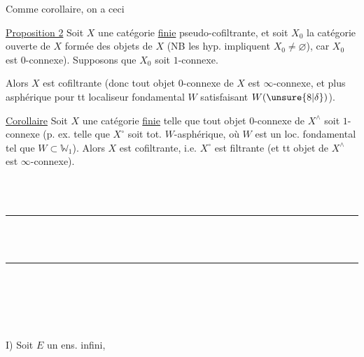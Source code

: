 Comme corollaire, on a ceci

\uline{Proposition 2} Soit $X$ une catégorie \uline{finie} pseudo-cofiltrante,  et soit $X_0$ la catégorie ouverte de $X$ formée des  objets de $X$ (NB les hyp. impliquent $X_0\ne\varnothing$), car $X_0$ est $0$-connexe). Supposons que $X_0$ soit $1$-connexe.

Alors $X$ est cofiltrante (donc tout objet $0$-connexe de $X$ est $\infty$-connexe, et plus  asphérique pour tt  localiseur fondamental $W$ satisfaisant $W(\unsure{8|\delta})$).

 \uline{Corollaire} Soit $X$ une catégorie \uline{finie} telle que tout objet $0$-connexe de $X^\wedge$ soit $1$-connexe (p. ex. telle que $X^\circ$ soit tot. $W$-asphérique, où $W$ est un loc. fondamental tel que $W\subset\mathbb{W}_1$). Alors $X$ est cofiltrante, i.e. $X^\circ$ est filtrante (et tt objet de $X^\wedge$ est $\infty$-connexe).

\\
\\
\rule{1cm}{0.3pt}

\\
\\
\rule{1cm}{0.3pt}

\\


\\
\\
\\
I) Soit $E$ un ens. infini,

